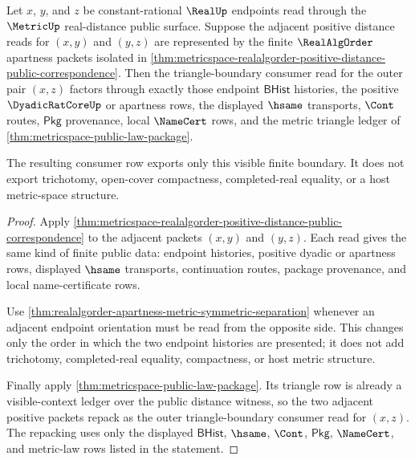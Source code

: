 \begin{theorem}
\label{thm:metricspace-apartness-positive-distance-triangle-boundary}
Let $x$, $y$, and $z$ be constant-rational $\RealUp$ endpoints read through
the $\MetricUp$ real-distance public surface. Suppose the adjacent positive
distance reads for $(x,y)$ and $(y,z)$ are represented by the finite
$\RealAlgOrder$ apartness packets isolated in
\autoref{thm:metricspace-realalgorder-positive-distance-public-correspondence}.
Then the triangle-boundary consumer read for the outer pair $(x,z)$ factors
through exactly those endpoint $\mathsf{BHist}$ histories, the positive
$\DyadicRatCoreUp$ or apartness rows, the displayed $\hsame$ transports,
$\Cont$ routes, $\mathsf{Pkg}$ provenance, local $\NameCert$ rows, and the
metric triangle ledger of \autoref{thm:metricspace-public-law-package}.

The resulting consumer row exports only this visible finite boundary. It does
not export trichotomy, open-cover compactness, completed-real equality, or a
host metric-space structure.
\end{theorem}
\begin{proof}
Apply
\autoref{thm:metricspace-realalgorder-positive-distance-public-correspondence}
to the adjacent packets $(x,y)$ and $(y,z)$. Each read gives the same kind of
finite public data: endpoint histories, positive dyadic or apartness rows,
displayed $\hsame$ transports, continuation routes, package provenance, and
local name-certificate rows.

Use
\autoref{thm:realalgorder-apartness-metric-symmetric-separation} whenever an
adjacent endpoint orientation must be read from the opposite side. This
changes only the order in which the two endpoint histories are presented; it
does not add trichotomy, completed-real equality, compactness, or host metric
structure.

Finally apply \autoref{thm:metricspace-public-law-package}. Its triangle row
is already a visible-context ledger over the public distance witness, so the
two adjacent positive packets repack as the outer triangle-boundary consumer
read for $(x,z)$. The repacking uses only the displayed $\mathsf{BHist}$,
$\hsame$, $\Cont$, $\mathsf{Pkg}$, $\NameCert$, and metric-law rows listed in
the statement.
\end{proof}

